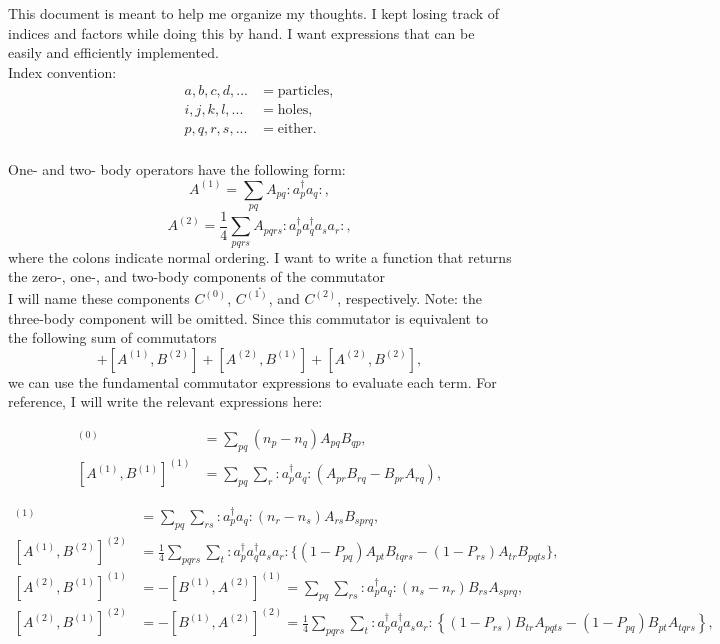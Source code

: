 \documentclass[12pt]{article}
\begin{document}
\noindent This document is meant to help me organize my thoughts. I kept losing track of indices and factors while doing this by hand. I want expressions that can be easily and efficiently implemented.\\

\noindent Index convention:
\begin{equation*}
\begin{split}
a,b,c,d,... &= \text{particles},\\
i,j,k,l,... &= \text{holes},\\
p,q,r,s,... &= \text{either}.\\
\end{split}
\end{equation*}


\noindent One- and two- body operators have the following form:
\begin{equation}
A^{(1)} = \sum_{pq} A_{pq} :a_p^\dagger a_q:,
\end{equation}
\begin{equation}
A^{(2)} = \frac{1}{4} \sum_{pqrs} A_{pqrs} :a_p^\dagger a_q^\dagger a_s a_r:,
\end{equation}
\noindent where the colons indicate normal ordering. I want to write a function that returns the zero-, one-, and two-body components of the commutator
\begin{equation}
[A^{(1)}+A^{(2)},B^{(1)}+B^{(2)}].
\end{equation}
I will name these components $C^{(0)}$, $C^{(1)}$, and $C^{(2)}$, respectively. Note: the three-body component will be omitted. Since this commutator is equivalent to the following sum of commutators
\begin{equation}
[A^{(1)},B^{(1)}]+[A^{(1)},B^{(2)}]+[A^{(2)},B^{(1)}]+[A^{(2)},B^{(2)}],
\end{equation}
we can use the fundamental commutator expressions to evaluate each term. For reference, I will write the relevant expressions here:

\begin{align}
[A^{(1)},B^{(1)}]^{(0)} &= \sum_{pq}(n_p-n_q)A_{pq}B_{qp},\\
[A^{(1)},B^{(1)}]^{(1)} &= \sum_{pq}\sum_{r} :a_p^\dagger a_q:(A_{pr}B_{rq}-B_{pr}A_{rq}),
\end{align}

\begin{align}
[A^{(1)},B^{(2)}]^{(1)} &= \sum_{pq}\sum_{rs} :a_p^\dagger a_q: (n_r-n_s) A_{rs}B_{sprq},\\
[A^{(1)},B^{(2)}]^{(2)} &= \frac{1}{4} \sum_{pqrs}\sum_t :a_p^\dagger a_q^\dagger a_s a_r : \{ (1-P_{pq})A_{pt}B_{tqrs} -(1-P_{rs})A_{tr}B_{pqts}\},\\
[A^{(2)},B^{(1)}]^{(1)} &= -[B^{(1)},A^{(2)}]^{(1)} = \sum_{pq}\sum_{rs} :a_p^\dagger a_q: (n_s-n_r) B_{rs}A_{sprq},\\
[A^{(2)},B^{(1)}]^{(2)} &= -[B^{(1)},A^{(2)}]^{(2)} = \frac{1}{4} \sum_{pqrs}\sum_t :a_p^\dagger a_q^\dagger a_s a_r :  \left\{ (1-P_{rs})B_{tr}A_{pqts} -  (1-P_{pq})B_{pt}A_{tqrs} \right\},
\end{align}
\end{document}
